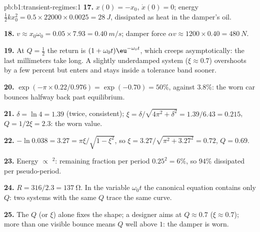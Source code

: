 \begin{solution}{pb:b1:transient-regimes:1}
\textbf{17.} $x(0) = -x_0$, $\dot x(0) = 0$; energy $\tfrac12 kx_0^2 =
0.5 \times 22000 \times 0.0025 = \qty{28}{J}$, dissipated as heat in the
damper's oil.

\textbf{18.} $v \approx x_0\omega_0 = 0.05 \times 7.93 = \qty{0.40}{m/s}$;
damper force $\alpha v \approx 1200 \times 0.40 = \qty{480}{N}$.

\textbf{19.} At $Q = \tfrac12$ the return is $(1 + \omega_0 t)\eu^{-\omega_0
t}$, which creeps asymptotically: the last millimeters take long. A
slightly underdamped system ($\xi \approx 0.7$) overshoots by a few
percent but enters and stays inside a tolerance band sooner.

\textbf{20.} $\exp(-\pi \times 0.22/0.976) = \exp(-0.70) = 50\%$, against
$3.8\%$: the worn car bounces halfway back past equilibrium.

\textbf{21.} $\delta = \ln 4 = 1.39$ (twice, consistent); $\xi =
\delta/\sqrt{4\pi^2 + \delta^2} = 1.39/6.43 = 0.215$, $Q = 1/2\xi = 2.3$:
the worn value.

\textbf{22.} $-\ln 0.038 = 3.27 = \pi\xi/\sqrt{1 - \xi^2}$, so $\xi =
3.27/\sqrt{\pi^2 + 3.27^2} = 0.72$, $Q = 0.69$.

\textbf{23.} Energy $\propto$ $^2$: remaining fraction per
period $0.25^2 = 6\%$, so $94\%$ dissipated per pseudo-period.

\textbf{24.} $R = 316/2.3 = \qty{137}{\ohm}$. In the variable $\omega_0 t$
the canonical equation contains only $Q$: two systems with the same $Q$
trace the same curve.

\textbf{25.} The  $Q$ (or $\xi$) alone fixes the shape; a
designer aims at $Q \approx 0.7$ ($\xi \approx 0.7$); more than one
visible bounce means $Q$ well above $1$: the damper is worn.
\end{solution}

